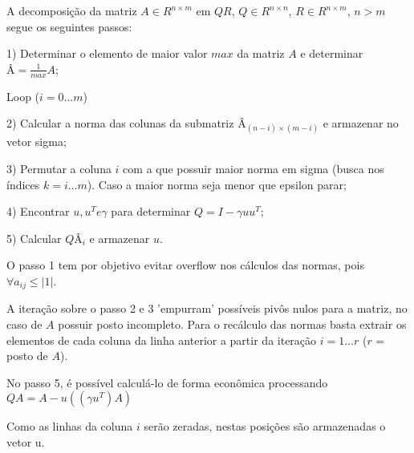 A decomposição da matriz $A \in R^{n\times m}$
 em $QR$, $Q \in R^{n\times n}$, $R \in R^{n\times m}$, $n > m$ segue os seguintes passos:
\newline


1) Determinar o elemento de maior valor $max$ da matriz $A$ e determinar $Â = \frac{1}{max}A$;

Loop ($i = 0 ... m$)

2) Calcular a norma das colunas da submatriz $Â_{(n-i)\times (m-i)}$ e armazenar no vetor sigma;

3) Permutar a coluna $i$ com a que possuir maior norma em sigma (busca nos índices $k = i \ldots m$). Caso a maior norma seja menor que epsilon parar;

4) Encontrar $u, u^T e \gamma $ para determinar $Q= I - \gamma u u^T$;

5) Calcular $QÂ_i$ e armazenar $u$.
\newline


O passo 1 tem por objetivo evitar overflow nos cálculos das normas, pois $\forall a_{ij} \le |1|$.

A iteração sobre o passo 2 e 3 'empurram’ possíveis pivôs nulos para a matriz, no caso de $A$ possuir posto incompleto. Para o recálculo das normas basta extrair os elementos de cada coluna da linha anterior a partir da iteração $i = 1 \ldots r$ ($r$ = posto de $A$).

No passo 5, é possível calculá-lo de forma econômica processando  $QA= A - u((\gamma  u^T)A)$

Como as linhas da coluna $i$ serão zeradas, nestas posições são armazenadas o vetor u.

